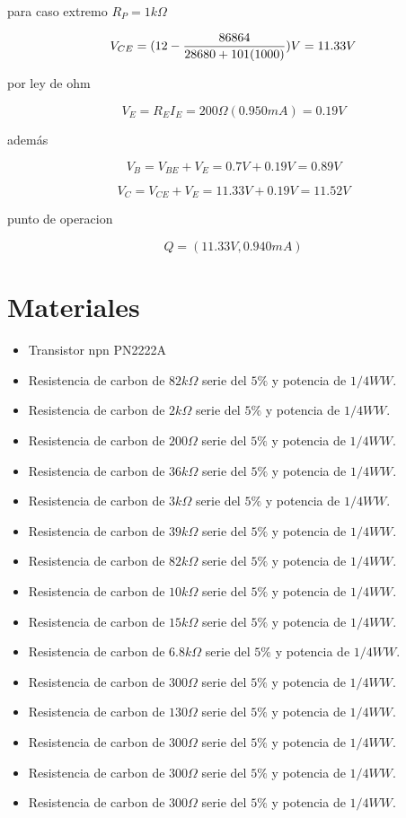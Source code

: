 \documentclass[10pt, a4paper]{article}
\begin{document}
    para caso extremo $R_P = 1k\Omega$

    $$V_{CE} = (12 - {86864 \over 28680 +101(1000)})V = 11.33V$$

    por ley de ohm

    $$V_E = R_EI_E = 200\Omega (0.950mA) = 0.19V$$

    además

    $$V_B = V_{BE} + V_E = 0.7V + 0.19V = 0.89V$$

    $$V_C = V_{CE} + V_E = 11.33V + 0.19V = 11.52V$$

    punto de operacion

    $$Q = (11.33V, 0.940mA)$$

    \newpage

    \section{Materiales}

    \begin{itemize}
        \item Transistor npn PN2222A
        \item Resistencia de carbon de $82k\Omega$  serie del $5\%$ y potencia de ${1/4 W} W$.
        \item Resistencia de carbon de $2k\Omega$  serie del $5\%$ y potencia de ${1/4 W} W$.
        \item Resistencia de carbon de $200\Omega$  serie del $5\%$ y potencia de ${1/4 W} W$.
        \item Resistencia de carbon de $36k\Omega$  serie del $5\%$ y potencia de ${1/4 W} W$.
        \item Resistencia de carbon de $3k\Omega$  serie del $5\%$ y potencia de ${1/4 W} W$.
        \item Resistencia de carbon de $39k\Omega$  serie del $5\%$ y potencia de ${1/4 W} W$.
        \item Resistencia de carbon de $82k\Omega$  serie del $5\%$ y potencia de ${1/4 W} W$.
        \item Resistencia de carbon de $10k\Omega$  serie del $5\%$ y potencia de ${1/4 W} W$.
        \item Resistencia de carbon de $15k\Omega$  serie del $5\%$ y potencia de ${1/4 W} W$.
        \item Resistencia de carbon de $6.8k\Omega$  serie del $5\%$ y potencia de ${1/4 W} W$.
        \item Resistencia de carbon de $300\Omega$  serie del $5\%$ y potencia de ${1/4 W} W$.
        \item Resistencia de carbon de $130\Omega$  serie del $5\%$ y potencia de ${1/4 W} W$.
        \item Resistencia de carbon de $300\Omega$  serie del $5\%$ y potencia de ${1/4 W} W$.
        \item Resistencia de carbon de $300\Omega$  serie del $5\%$ y potencia de ${1/4 W} W$.
        \item Resistencia de carbon de $300\Omega$  serie del $5\%$ y potencia de ${1/4 W} W$.
    \end{itemize}
\end{document}
